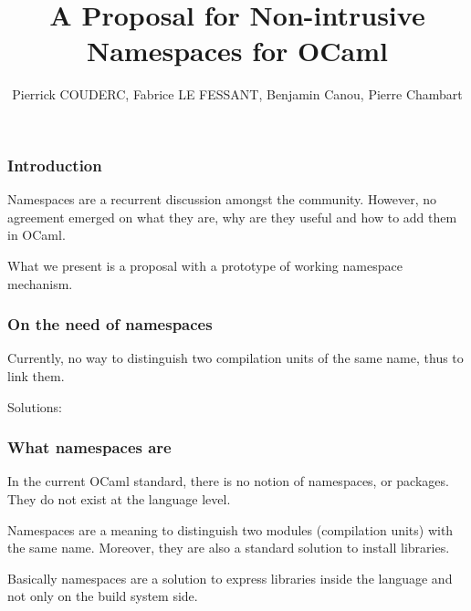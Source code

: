 \documentclass{beamer}
\author{Pierrick COUDERC, Fabrice LE FESSANT, Benjamin Canou, Pierre Chambart}
\title{A Proposal for Non-intrusive Namespaces for OCaml}
\begin{document}
\maketitle

\begin{frame}
\frametitle{Introduction}

Namespaces are a recurrent discussion amongst the community. However, no
agreement emerged on what they are, why are they useful and how to add them in
OCaml.

\medskip

What we present is a proposal with a prototype of working namespace mechanism.
\end{frame}

\begin{frame}[fragile]
\frametitle{On the need of namespaces}



Currently, no way to distinguish two compilation units of the same name, thus to
link them.

Solutions: 
\begin{itemize}
\end{itemize}
\end{frame}




\begin{frame}
\frametitle{What namespaces are}

In the current OCaml standard, there is no notion of namespaces, or
packages. They do not exist at the language level.

\medskip

Namespaces are a meaning to distinguish two modules (compilation units) with the
same name. Moreover, they are also a standard solution to install libraries.

\medskip

Basically namespaces are a solution to express libraries inside the language and
not only on the build system side. 

\end{frame}
\end{document}
